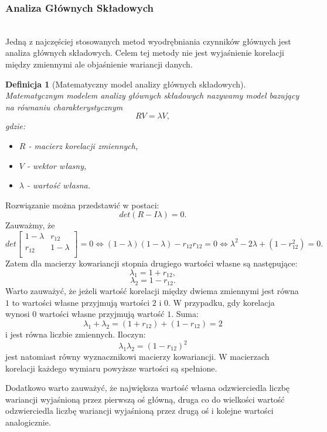 \documentclass[12pt,a4paper]{report}
\newtheorem{df}{Definicja}[chapter]
\begin{document}
\subsubsection{Analiza Głównych Składowych}
{\citep[Sec 11.1]{sadzwpr}}
\\Jedną z najczęściej stosowanych metod wyodrębniania czynników głównych jest analiza głównych składowych.
Celem tej metody nie jest wyjaśnienie korelacji między zmiennymi ale objaśnienie wariancji danych. 
\begin{df}[Matematyczny model analizy głównych składowych]

Matematycznym modelem analizy głównych składowych nazywamy model bazujący na równaniu charakterystycznym 
$$
RV = \lambda V,
$$
gdzie:
\begin{itemize}
\item $R$ - macierz korelacji zmiennych,
\item $V$ - wektor własny, 
\item $\lambda $ - wartość własna.
\end{itemize}
\end{df}

Rozwiązanie można przedstawić w postaci:
$$
det(R - I \lambda)=0.
$$
Zauważmy, że 
$$det \left[
        \begin{array}{cc}
         1 - \lambda & r_{12}\\
         r_{12} & 1 - \lambda\\
         \end{array}
      \right] = 0 \Leftrightarrow (1-\lambda)(1-\lambda)- r_{12}r_{12} = 0 \Leftrightarrow \lambda^2 - 2\lambda + (1 - r_{12}^2)=0.$$
Zatem dla macierzy kowariancji stopnia drugiego wartości własne są następujące:
$$
\lambda_1 = 1 + r_{12},
$$
$$
\lambda_2 = 1 - r_{12}.
$$
Warto zauważyć, że jeżeli wartość korelacji między dwiema zmiennymi jest równa $1$ to wartości własne przyjmują wartości $2$ i $0$. W przypadku, gdy korelacja wynosi $0$ wartości własne przyjmują wartość $1$. Suma:
$$
\lambda_1+\lambda_2=(1 + r_{12})+(1 - r_{12}) = 2
$$
i jest równa liczbie zmiennych. Iloczyn:
$$
\lambda_1\lambda_2=(1 - r_{12})^2
$$
jest natomiast równy wyznacznikowi macierzy kowariancji. W macierzach korelacji każdego wymiaru powyższe wartości są spełnione. 

Dodatkowo warto zauważyć, że największa wartość własna odzwierciedla liczbę wariancji wyjaśnioną przez pierwszą oś główną, druga co do wielkości wartość odzwierciedla liczbę wariancji wyjaśnioną przez drugą oś i kolejne wartości analogicznie. 
\end{document}
